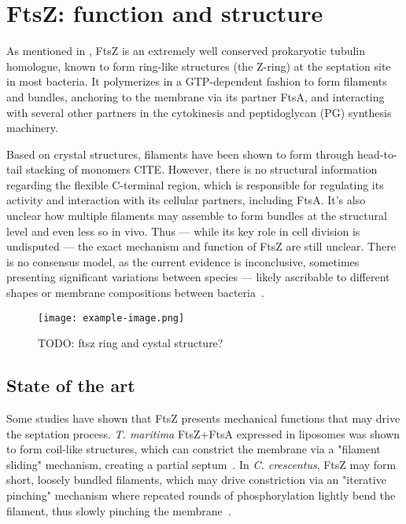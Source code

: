 \chapter{FtsZ: function and structure}\label{ftsz}

As mentioned in , FtsZ is an extremely well conserved prokaryotic tubulin homologue, known to form ring-like structures (the Z-ring) at the septation site in most bacteria.
It polymerizes in a GTP-dependent fashion to form filaments and bundles, anchoring to the membrane via its partner FtsA, and interacting with several other partners in the cytokinesis and peptidoglycan (PG) synthesis machinery.

Based on crystal structures, filaments have been shown to form through head-to-tail stacking of monomers CITE.
However, there is no structural information regarding the flexible C-terminal region, which is responsible for regulating its activity and interaction with its cellular partners, including FtsA.
It's also unclear how multiple filaments may assemble to form bundles at the structural level and even less so in vivo.
Thus --- while its key role in cell division is undisputed --- the exact mechanism and function of FtsZ are still unclear.
There is no consensus model, as the current evidence is inconclusive, sometimes presenting significant variations between species --- likely ascribable to different shapes or membrane compositions between bacteria~\cite{barrowsFtsZDynamicsBacterial2021,mcquillenInsightsStructureFunction2020}.

\begin{figure}[ht]
    \centering
    \texttt{[image: example-image.png]}
    \caption{TODO: ftsz ring and cystal structure?}
    \label{fig:ftsz_ring}
\end{figure}

\localtableofcontents

\section{State of the art}

Some studies have shown that FtsZ presents mechanical functions that may drive the septation process.
\textit{T. maritima} FtsZ+FtsA expressed in liposomes was shown to form coil-like structures, which can constrict the membrane via a "filament sliding" mechanism, creating a partial septum~\cite{szwedziakArchitectureRingFormed2014}.
In \textit{C. crescentus}, FtsZ may form short, loosely bundled filaments, which may drive constriction via an "iterative pinching" mechanism where repeated rounds of phosphorylation lightly bend the filament, thus slowly pinching the membrane~\cite{liStructureFtsZFilaments2007}.

